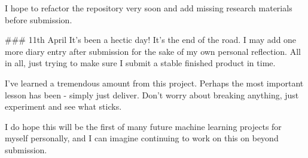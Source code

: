 \documentclass[letterpaper,10pt]{article}
\begin{document}
\begin{markdown}
I hope to refactor the repository very soon and add missing research materials before submission.

### 11th April
It's been a hectic day! It's the end of the road. I may add one more diary entry after submission for the sake of my own personal reflection. All in all, just trying to make sure I submit a stable finished product in time.
  
I've learned a tremendous amount from this project. Perhaps the most important lesson has been - simply just deliver. Don't worry about breaking anything, just experiment and see what sticks.
  
I do hope this will be the first of many future machine learning projects for myself personally, and I can imagine continuing to work on this on beyond submission.


\end{markdown}
\end{document}
